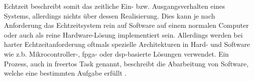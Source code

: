 \documentclass[../EDF Master Thesis.tex]{subfiles}
\begin{document}
    \clearpage

    Echtzeit beschreibt somit das zeitliche Ein- bzw. Ausgangsverhalten eines Systems, allerdings nichts über dessen Realisierung.
    Dies kann je nach Anforderung das Echtzeitsystem rein auf Software auf einem normalen Computer oder auch als reine Hardware-Lösung implementiert sein.
    Allerdings werden bei harter Echtzeitanforderung oftmals spezielle Architekturen in Hard- und Software wie z.b. Mikrocontroller-, \ac{fpga}- oder \ac{dsp}-basierte Lösungen verwendet.
    Ein Prozess, auch in \ac{freertos} Task genannt, beschreibt die Abarbeitung von Software, welche eine bestimmten Aufgabe erfüllt \autocite{echtzeit_systeme}.

    \clearpage
\end{document}
